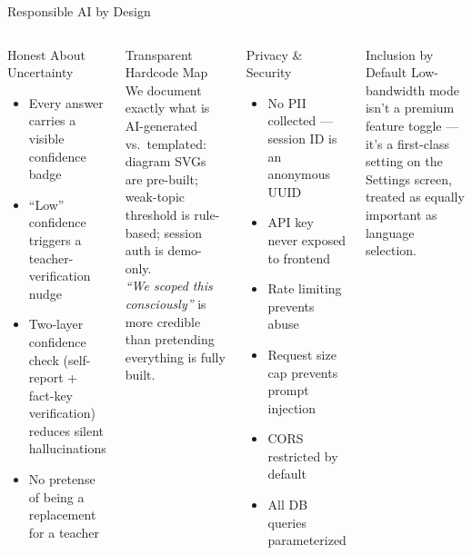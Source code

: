 \documentclass[aspectratio=169, 12pt]{beamer}
\begin{document}
\begin{frame}{Responsible AI by Design}
  \begin{columns}[T]
      \begin{block}{Honest About Uncertainty}
        \begin{itemize}
          \item Every answer carries a visible confidence badge
          \item ``Low'' confidence triggers a teacher-verification nudge
          \item Two-layer confidence check (self-report + fact-key
                verification) reduces silent hallucinations
          \item No pretense of being a replacement for a teacher
        \end{itemize}
      \end{block}
      \vspace{6pt}
      \begin{block}{Transparent Hardcode Map}
        We document exactly what is AI-generated vs.\ templated:
        diagram SVGs are pre-built; weak-topic threshold is
        rule-based; session auth is demo-only.\\[4pt]
        \emph{``We scoped this consciously''} is more credible than
        pretending everything is fully built.
      \end{block}
      \begin{block}{Privacy \& Security}
        \begin{itemize}
          \item No PII collected --- session ID is an anonymous UUID
          \item API key never exposed to frontend
          \item Rate limiting prevents abuse
          \item Request size cap prevents prompt injection
          \item CORS restricted by default
          \item All DB queries parameterized
        \end{itemize}
      \end{block}
      \vspace{6pt}
      \begin{alertblock}{Inclusion by Default}
        Low-bandwidth mode isn't a premium feature toggle ---
        it's a first-class setting on the Settings screen,
        treated as equally important as language selection.
      \end{alertblock}
  \end{columns}
\end{frame}
\end{document}
